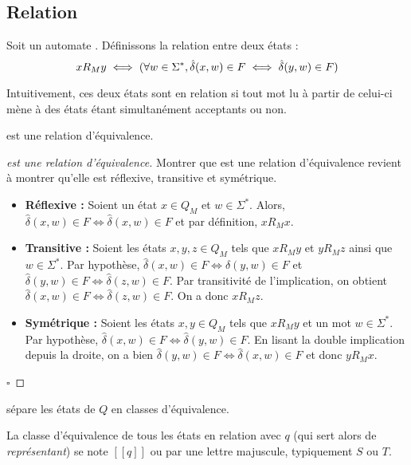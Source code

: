 


\subsection{Relation \rm}\label{ss:rm}

Soit un automate \automaton. Définissons la relation \rm entre deux états :
$$xR_My \iff (\forall w \in \Sigma^*,\hat{\delta}(x,w) \in F \iff \hat{\delta}(y,w) \in F)$$

Intuitivement, ces deux états sont en relation si tout mot lu à partir de celui-ci mène à des états étant simultanément acceptants ou non.

\begin{proposition}[\rm]
 \rm est une relation d'équivalence.
\end{proposition}

\begin{proof}[\rm est une relation d'équivalence] Montrer que \rm est une relation d'équivalence revient à montrer qu'elle est réflexive, transitive et symétrique.
 \begin{itemize}
	 \item \textbf{Réflexive :} Soient un état $x \in Q_M$ et $w \in \Sigma^*$. Alors, $\hat{\delta}(x,w) \in F \iff \hat{\delta}(x,w) \in F$ et par définition, $xR_Mx$.
	 \item \textbf{Transitive :} Soient les états $x,y,z \in Q_M$ tels que $xR_My$ et $yR_Mz$ ainsi que $w \in \Sigma^*$. Par hypothèse, $\hat{\delta}(x,w) \in F \iff \hat{\delta}(y,w)\in F$ et $\hat{\delta}(y,w) \in F\iff \hat{\delta}(z,w) \in F$. Par transitivité de l'implication, on obtient $\hat{\delta}(x,w) \in F \iff \hat{\delta}(z,w)\in F$. On a donc $xR_Mz$.
	 \item \textbf{Symétrique : } Soient les états $x,y \in Q_M$ tels que $xR_My$ et un mot $w \in \Sigma^*$. Par hypothèse, $\hat{\delta}(x, w)\in F \iff \hat{\delta}(y, w)\in F$. En lisant la double implication depuis la droite, on a bien $\hat{\delta}(y, w) \in F\iff \hat{\delta}(x, w)\in F$ et donc $yR_Mx$.
 \end{itemize}
 \hfill$\square$
\end{proof}

\begin{corollary}
 \rm sépare les états de $Q$ en classes d'équivalence.
\end{corollary}

La classe d'équivalence de tous les états en relation \rm avec $q$ (qui sert alors de \emph{représentant}) se note $[[q]]$ ou par une lettre majuscule, typiquement $S$ ou $T$.

